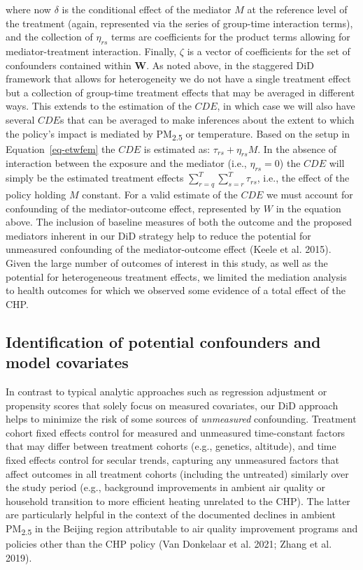 \documentclass[
  letterpaper,
  DIV=11,
  numbers=noendperiod]{scrartcl}
\begin{document}
where now \(\delta\) is the conditional effect of the mediator \(M\) at
the reference level of the treatment (again, represented via the series
of group-time interaction terms), and the collection of \(\eta_{rs}\)
terms are coefficients for the product terms allowing for
mediator-treatment interaction. Finally, \(\zeta\) is a vector of
coefficients for the set of confounders contained within \(\mathbf{W}\).
As noted above, in the staggered DiD framework that allows for
heterogeneity we do not have a single treatment effect but a collection
of group-time treatment effects that may be averaged in different ways.
This extends to the estimation of the \(CDE\), in which case we will
also have several \(CDE\)s that can be averaged to make inferences about
the extent to which the policy's impact is mediated by
PM\textsubscript{2.5} or temperature. Based on the setup in
Equation~\ref{eq-etwfem} the \(CDE\) is estimated as:
\(\tau_{rs} + \eta_{rs}M\). In the absence of interaction between the
exposure and the mediator (i.e., \(\eta_{rs}=0\)) the \(CDE\) will
simply be the estimated treatment effects
\(\sum_{r=q}^{T} \sum_{s=r}^{T} \tau_{rs}\), i.e., the effect of the
policy holding \(M\) constant. For a valid estimate of the \(CDE\) we
must account for confounding of the mediator-outcome effect, represented
by \(W\) in the equation above. The inclusion of baseline measures of
both the outcome and the proposed mediators inherent in our DiD strategy
help to reduce the potential for unmeasured confounding of the
mediator-outcome effect (Keele et al. 2015). Given the large number of
outcomes of interest in this study, as well as the potential for
heterogeneous treatment effects, we limited the mediation analysis to
health outcomes for which we observed some evidence of a total effect of
the CHP.

\subsection{Identification of potential confounders and model
covariates}\label{identification-of-potential-confounders-and-model-covariates}

In contrast to typical analytic approaches such as regression adjustment
or propensity scores that solely focus on measured covariates, our DiD
approach helps to minimize the risk of some sources of \emph{unmeasured}
confounding. Treatment cohort fixed effects control for measured and
unmeasured time-constant factors that may differ between treatment
cohorts (e.g., genetics, altitude), and time fixed effects control for
secular trends, capturing any unmeasured factors that affect outcomes in
all treatment cohorts (including the untreated) similarly over the study
period (e.g., background improvements in ambient air quality or
household transition to more efficient heating unrelated to the CHP).
The latter are particularly helpful in the context of the documented
declines in ambient PM\textsubscript{2.5} in the Beijing region
attributable to air quality improvement programs and policies other than
the CHP policy (Van Donkelaar et al. 2021; Zhang et al. 2019).
\end{document}
